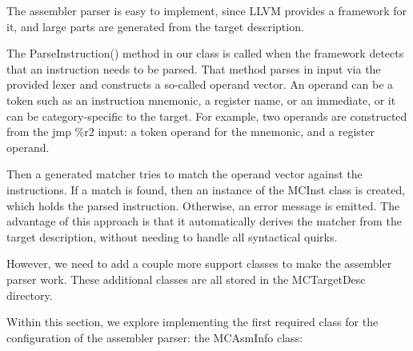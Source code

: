
The assembler parser is easy to implement, since LLVM provides a framework for it, and large parts are generated from the target description.

The ParseInstruction() method in our class is called when the framework detects that an instruction needs to be parsed. That method parses in input via the provided lexer and constructs a so-called operand vector. An operand can be a token such as an instruction mnemonic, a register name, or an immediate, or it can be category-specific to the target. For example, two operands are constructed from the jmp \%r2 input: a token operand for the mnemonic, and a register operand.

Then a generated matcher tries to match the operand vector against the instructions. If a match is found, then an instance of the MCInst class is created, which holds the parsed instruction. Otherwise, an error message is emitted. The advantage of this approach is that it automatically derives the matcher from the target description, without needing to handle all syntactical quirks.

However, we need to add a couple more support classes to make the assembler parser work. These additional classes are all stored in the MCTargetDesc directory.



Within this section, we explore implementing the first required class for the configuration of the assembler parser: the MCAsmInfo class:

